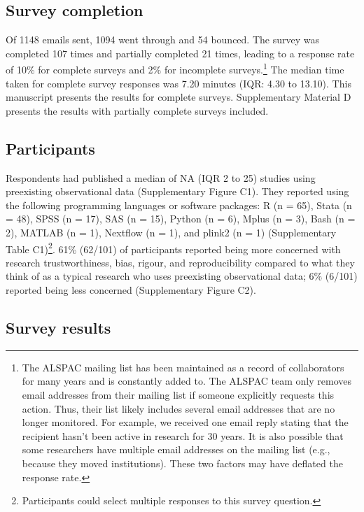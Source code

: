 \documentclass[
  man,floatsintext]{apa6}
\begin{document}
\hypertarget{survey-completion}{%
\subsection{Survey completion}\label{survey-completion}}

Of 1148 emails sent, 1094 went through and 54 bounced. The survey was completed 107 times and partially completed 21 times, leading to a response rate of 10\% for complete surveys and 2\% for incomplete surveys.\footnote[1]{The ALSPAC mailing list has been maintained as a record of collaborators for many years and is constantly added to. The ALSPAC team only removes email addresses from their mailing list if someone explicitly requests this action. Thus, their list likely includes several email addresses that are no longer monitored. For example, we received one email reply stating that the recipient hasn’t been active in research for 30 years. It is also possible that some researchers have multiple email addresses on the mailing list (e.g., because they moved institutions). These two factors may have deflated the response rate.} The median time taken for complete survey responses was 7.20 minutes (IQR: 4.30 to 13.10). This manuscript presents the results for complete surveys. Supplementary Material D presents the results with partially complete surveys included.

\hypertarget{participants-1}{%
\subsection{Participants}\label{participants-1}}

Respondents had published a median of NA (IQR 2 to 25) studies using preexisting observational data (Supplementary Figure C1). They reported using the following programming languages or software packages: R (n = 65), Stata (n = 48), SPSS (n = 17), SAS (n = 15), Python (n = 6), Mplus (n = 3), Bash (n = 2), MATLAB (n = 1), Nextflow (n = 1), and plink2 (n = 1) (Supplementary Table C1)\footnote[2]{Participants could select multiple responses to this survey question.}. 61\% (62/101) of participants reported being more concerned with research trustworthiness, bias, rigour, and reproducibility compared to what they think of as a typical research who uses preexisting observational data; 6\% (6/101) reported being less concerned (Supplementary Figure C2).

\hypertarget{survey-results}{%
\subsection{Survey results}\label{survey-results}}
\end{document}
